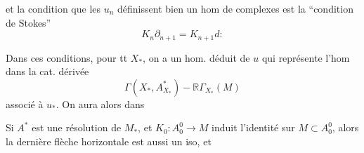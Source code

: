 
et la condition que les $u_n$ définissent bien un hom de complexes est la ``condition de Stokes''
\[
K_n\partial_{n+1}=K_{n+1}d:
\]

Dans ces conditions, pour tt $X_*$, on a un hom.  déduit de $u$
qui représente l'hom dans la cat. dérivée
\[
\Gamma(X_*,A_{X_*}^*)\mathbin{-}\mathbb R\Gamma_{X_*}(M)
\]
associé à $u_*$. On aura alors  dans

Si $A^*$ est une résolution de $M_*$, et $K_0:A_0^0\longrightarrow M$ induit l'identité sur $M\subset A_0^0$, alors la dernière flèche horizontale est aussi un iso, et

